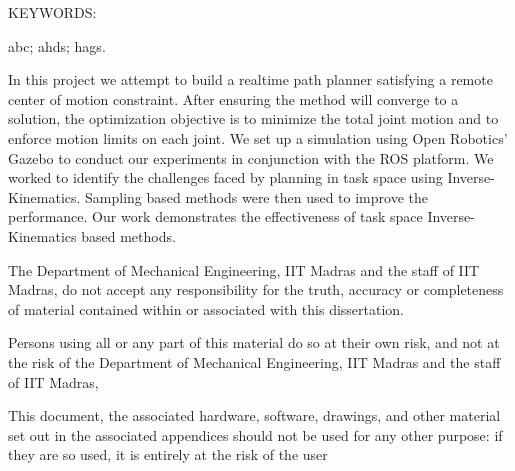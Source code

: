 \documentclass[BTech]{iitmdiss}
\begin{document}
    \abstract

    \noindent KEYWORDS: \hspace*{0.5em} \parbox[t]{4.4in}{abc; ahds; hags.}

    \vspace*{24pt}
    \noindent
    In this project we attempt to build a realtime path planner satisfying a remote center of motion constraint.
    After ensuring the method will converge to a solution, the optimization objective is to minimize the total joint motion and to enforce motion limits on each joint.
    We set up a simulation using Open Robotics’ Gazebo to conduct our experiments in conjunction with the ROS platform.
    We worked to identify the challenges faced by planning in task space using Inverse-Kinematics.
    Sampling based methods were then used to improve the performance.
    Our work demonstrates the effectiveness of task space Inverse-Kinematics based methods.



    \pagebreak

    \disclaimer
    The Department of Mechanical Engineering, IIT Madras and the staff of IIT Madras, do not accept any responsibility for the truth, accuracy or completeness of material contained within or associated with this dissertation.

    Persons using all or any part of this material do so at their own risk, and not at the risk of the Department of Mechanical Engineering, IIT Madras and the staff of IIT Madras,

    This document, the associated hardware, software, drawings, and other material set out in the associated appendices should not be used for any other purpose: if they are so used, it is entirely at the risk of the user

    \pagebreak



    \begin{singlespace}
        \tableofcontents
        \thispagestyle{empty}

        \listoftables
        \listoffigures
    \end{singlespace}


    \newpage
    \begin{tabbing}

    \end{tabbing}
    \abbreviations
\end{document}
